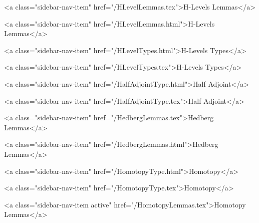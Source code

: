       
        
          <a class="sidebar-nav-item" href="/HLevelLemmas.tex">H-Levels Lemmas</a>
        
      
    
      
        
          <a class="sidebar-nav-item" href="/HLevelLemmas.html">H-Levels Lemmas</a>
        
      
    
      
        
          <a class="sidebar-nav-item" href="/HLevelTypes.html">H-Levels Types</a>
        
      
    
      
        
          <a class="sidebar-nav-item" href="/HLevelTypes.tex">H-Levels Types</a>
        
      
    
      
        
          <a class="sidebar-nav-item" href="/HalfAdjointType.html">Half Adjoint</a>
        
      
    
      
        
          <a class="sidebar-nav-item" href="/HalfAdjointType.tex">Half Adjoint</a>
        
      
    
      
        
          <a class="sidebar-nav-item" href="/HedbergLemmas.tex">Hedberg Lemmas</a>
        
      
    
      
        
          <a class="sidebar-nav-item" href="/HedbergLemmas.html">Hedberg Lemmas</a>
        
      
    
      
        
          <a class="sidebar-nav-item" href="/HomotopyType.html">Homotopy</a>
        
      
    
      
        
          <a class="sidebar-nav-item" href="/HomotopyType.tex">Homotopy</a>
        
      
    
      
        
          <a class="sidebar-nav-item active" href="/HomotopyLemmas.tex">Homotopy Lemmas</a>
        
      
    
